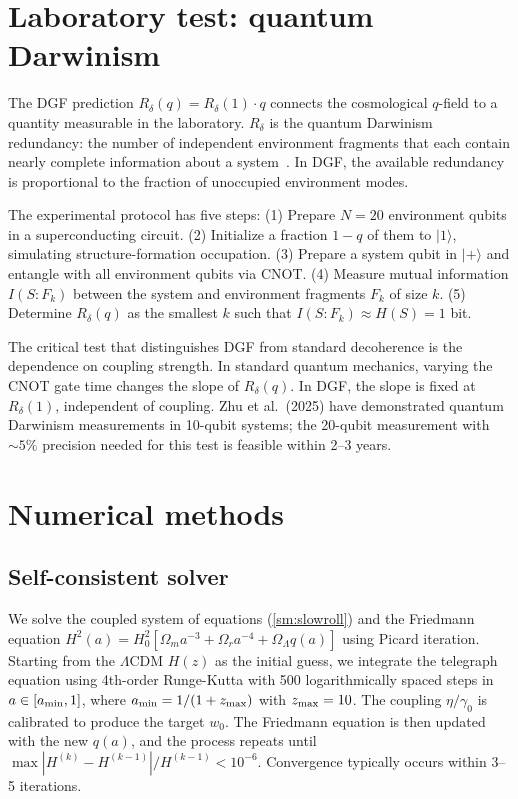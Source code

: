 \documentclass[12pt,a4paper]{article}
\begin{document}
\section{Laboratory test: quantum Darwinism}

The DGF prediction $R_\delta(q)=R_\delta(1)\cdot q$ connects the cosmological $q$-field to a quantity measurable in the laboratory. $R_\delta$ is the quantum Darwinism redundancy: the number of independent environment fragments that each contain nearly complete information about a system~\cite{zurek2009}. In DGF, the available redundancy is proportional to the fraction of unoccupied environment modes.

The experimental protocol has five steps: (1) Prepare $N=20$ environment qubits in a superconducting circuit. (2) Initialize a fraction $1-q$ of them to $|1\rangle$, simulating structure-formation occupation. (3) Prepare a system qubit in $|+\rangle$ and entangle with all environment qubits via CNOT. (4) Measure mutual information $I(S:F_k)$ between the system and environment fragments $F_k$ of size $k$. (5) Determine $R_\delta(q)$ as the smallest $k$ such that $I(S:F_k)\approx H(S)=1$ bit.

The critical test that distinguishes DGF from standard decoherence is the dependence on coupling strength. In standard quantum mechanics, varying the CNOT gate time changes the slope of $R_\delta(q)$. In DGF, the slope is fixed at $R_\delta(1)$, independent of coupling. Zhu et al.\ (2025) have demonstrated quantum Darwinism measurements in 10-qubit systems; the 20-qubit measurement with $\sim5\%$ precision needed for this test is feasible within 2--3 years.

\section{Numerical methods}

\subsection{Self-consistent solver}

We solve the coupled system of equations (\ref{sm:slowroll}) and the Friedmann equation $H^2(a)=H_0^2[\Omega_m a^{-3}+\Omega_r a^{-4}+\Omega_\Lambda q(a)]$ using Picard iteration. Starting from the $\Lambda$CDM $H(z)$ as the initial guess, we integrate the telegraph equation using 4th-order Runge-Kutta with 500 logarithmically spaced steps in $a\in[a_{\rm min},1]$, where $a_{\rm min}=1/(1+z_{\rm max})$ with $z_{\rm max}=10$. The coupling $\eta/\gamma_0$ is calibrated to produce the target $w_0$. The Friedmann equation is then updated with the new $q(a)$, and the process repeats until $\max|H^{(k)}-H^{(k-1)}|/H^{(k-1)}<10^{-6}$. Convergence typically occurs within 3--5 iterations.
\end{document}
